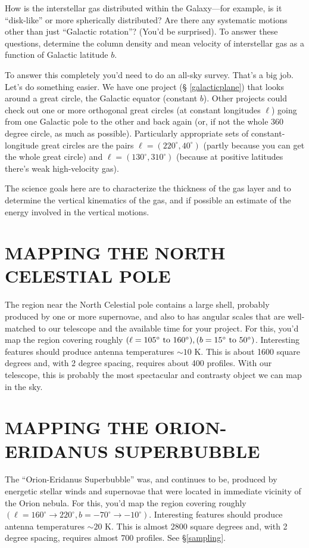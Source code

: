 \documentclass[psfig,preprint]{aastex}
\begin{document}
How is the interstellar gas distributed within the Galaxy---for example,
is it ``disk-like'' or more spherically distributed? Are there any
systematic motions other than just ``Galactic rotation''? (You'd be
surprised).  To answer these questions, determine the column density
and mean velocity of interstellar gas as a function of Galactic latitude
$b$. 

	To answer this completely you'd need to do an all-sky survey. That's
a big job.  Let's do something easier. We have one project (\S
\ref{galacticplane}) that looks around a great circle, the Galactic
equator (constant $b$). Other projects could check out one or more
orthogonal great circles (at constant longitudes $\ell$) going from one
Galactic pole to the other and back again (or, if not the whole 360
degree circle, as much as possible).  Particularly appropriate sets of
constant-longitude great circles are the pairs $\ell = (220^\circ,
40^\circ)$ (partly because you can get the whole great circle) and $\ell
= (130^\circ, 310^\circ)$ (because at positive latitudes there's weak
high-velocity gas).

	The science goals here are to characterize the thickness of the
gas layer and to determine the vertical kinematics of the gas, and if
possible an estimate of the energy involved in the vertical motions.

\section{MAPPING THE NORTH CELESTIAL POLE} \label{celestial}

The region near the North Celestial pole contains a large shell,
probably produced by one or more supernovae, and also to has angular
scales that are well-matched to our telescope and the available time for
your project. For this, you'd map the region covering roughly
$(\ell=105^\circ \ {\rm to} \ 160^\circ), (b=15^\circ \ {\rm to}
\ 50^\circ)$. Interesting features should produce antenna temperatures
$\sim 10$ K. This is about 1600 square degrees and, with 2 degree
spacing, requires about 400 profiles. With our telescope, this is
probably the most spectacular and contrasty object we can map in the
sky.

\section{MAPPING THE ORION-ERIDANUS SUPERBUBBLE} \label{eridanus}

The ``Orion-Eridanus Superbubble'' was, and continues to be, produced by
energetic stellar winds and supernovae that were located in immediate
vicinity of the Orion nebula. For this, you'd map the region covering
roughly $(\ell=160^\circ \rightarrow 220^\circ, b=-70^\circ \rightarrow
-10^\circ)$. Interesting features should produce antenna temperatures
$\sim 20$ K. This is almost 2800 square degrees and, with 2 degree
spacing, requires almost 700 profiles. See \S \ref{sampling}.
\end{document}
